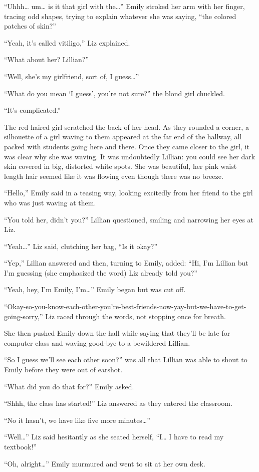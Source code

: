“Uhhh… um… is it that girl with the…” Emily stroked her arm with her finger, tracing odd shapes, trying to explain whatever she was saying, “the colored patches of skin?”

“Yeah, it’s called vitiligo,” Liz explained.

“What about her? Lillian?”

“Well, she’s my girlfriend, sort of, I guess…”

“What do you mean ‘I guess’, you’re not sure?” the blond girl chuckled.

“It’s complicated.”

The red haired girl scratched the back of her head. As they rounded a corner, a silhouette of a girl waving to them appeared at the far end of the hallway, all packed with students going here and there. Once they came closer to the girl, it was clear why she was waving. It was undoubtedly Lillian: you could see her dark skin covered in big, distorted white spots. She was beautiful, her pink waist length hair seemed like it was flowing even though there was no breeze.

“Hello,” Emily said in a teasing way, looking excitedly from her friend to the girl who was just waving at them.

“You told her, didn’t you?” Lillian questioned, smiling and narrowing her eyes at Liz.

“Yeah…” Liz said, clutching her bag, “Is it okay?”

“Yep,” Lillian answered and then, turning to Emily, added: “Hi, I’m Lillian but I’m guessing (she emphasized the word) Liz already told you?”

“Yeah, hey, I’m Emily, I’m…” Emily began but was cut off.

“Okay-so-you-know-each-other-you’re-best-friends-now-yay-but-we-have-to-get-going-sorry,” Liz raced through the words, not stopping once for breath.

She then pushed Emily down the hall while saying that they’ll be late for computer class and waving good-bye to a bewildered Lillian.

“So I guess we’ll see each other soon?” was all that Lillian was able to shout to Emily before they were out of earshot.

“What did you do that for?” Emily asked.

“Shhh, the class has started!” Liz answered as they entered the classroom.

“No it hasn’t, we have like five more minutes…”

“Well…” Liz said hesitantly as she seated herself, “I… I have to read my textbook!”

“Oh, alright…” Emily murmured and went to sit at her own desk.